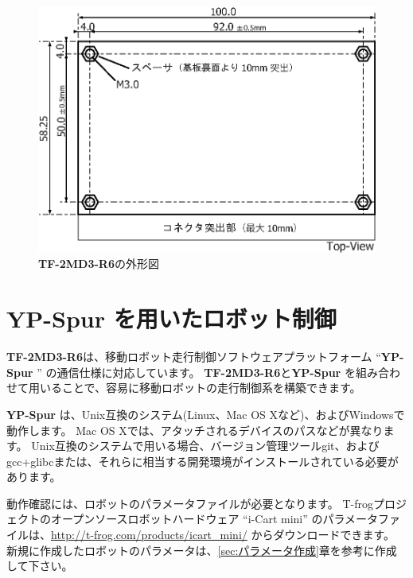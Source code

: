 \documentclass[11pt,a4j,openany,fleqn]{jbook}
\begin{document}
\begin{figure}[H]
\centering\includegraphics[width=130mm]{shape.eps}
\caption{{\bf TF-2MD3-R6}の外形図}
\label{fig:shape}
\end{figure}



\newpage
\section{{\bf YP-Spur} を用いたロボット制御}
\label{sec:YP-Spur}

{\bf TF-2MD3-R6}は、移動ロボット走行制御ソフトウェアプラットフォーム ``{\bf YP-Spur} '' の通信仕様に対応しています。
{\bf TF-2MD3-R6}と{\bf YP-Spur} を組み合わせて用いることで、容易に移動ロボットの走行制御系を構築できます。
\par

{\bf YP-Spur} は、Unix互換のシステム(Linux、Mac OS Xなど)、およびWindowsで動作します。
Mac OS Xでは、アタッチされるデバイスのパスなどが異なります。
Unix互換のシステムで用いる場合、バージョン管理ツールgit、およびgcc+glibcまたは、それらに相当する開発環境がインストールされている必要があります。\par

動作確認には、ロボットのパラメータファイルが必要となります。
T-frogプロジェクトのオープンソースロボットハードウェア ``i-Cart mini'' のパラメータファイルは、\url{http://t-frog.com/products/icart_mini/} からダウンロードできます。
新規に作成したロボットのパラメータは、\ref{sec:パラメータ作成}章を参考に作成して下さい。\par
\end{document}
